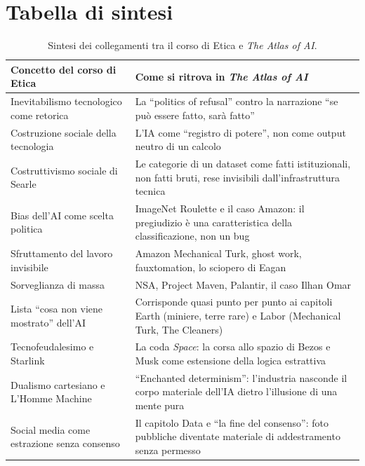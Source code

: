 \documentclass[a4paper,11pt]{article}
\begin{document}
\section{Tabella di sintesi}

\begin{table}[h!]
\centering
\renewcommand{\arraystretch}{1.35}
\begin{tabular}{p{6cm}p{8.5cm}}
\toprule
\textbf{Concetto del corso di Etica} & \textbf{Come si ritrova in \emph{The Atlas of AI}} \\
\midrule
Inevitabilismo tecnologico come retorica & La ``politics of refusal'' contro la narrazione ``se può essere fatto, sarà fatto'' \\
Costruzione sociale della tecnologia & L'IA come ``registro di potere'', non come output neutro di un calcolo \\
Costruttivismo sociale di Searle & Le categorie di un dataset come fatti istituzionali, non fatti bruti, rese invisibili dall'infrastruttura tecnica \\
Bias dell'AI come scelta politica & ImageNet Roulette e il caso Amazon: il pregiudizio è una caratteristica della classificazione, non un bug \\
Sfruttamento del lavoro invisibile & Amazon Mechanical Turk, ghost work, fauxtomation, lo sciopero di Eagan \\
Sorveglianza di massa & NSA, Project Maven, Palantir, il caso Ilhan Omar \\
Lista ``cosa non viene mostrato'' dell'AI & Corrisponde quasi punto per punto ai capitoli Earth (miniere, terre rare) e Labor (Mechanical Turk, The Cleaners) \\
Tecnofeudalesimo e Starlink & La coda \emph{Space}: la corsa allo spazio di Bezos e Musk come estensione della logica estrattiva \\
Dualismo cartesiano e L'Homme Machine & ``Enchanted determinism'': l'industria nasconde il corpo materiale dell'IA dietro l'illusione di una mente pura \\
Social media come estrazione senza consenso & Il capitolo Data e ``la fine del consenso'': foto pubbliche diventate materiale di addestramento senza permesso \\
\bottomrule
\end{tabular}
\caption{Sintesi dei collegamenti tra il corso di Etica e \emph{The Atlas of AI}.}
\end{table}
\end{document}

